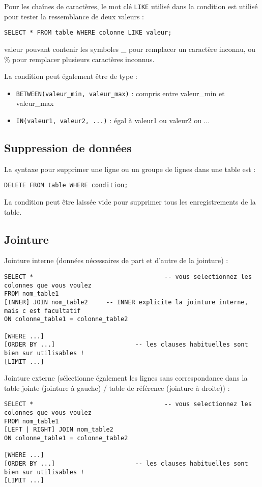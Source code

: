 \documentclass[11pt]{article}
\begin{document}
				Pour les chaînes de caractères, le mot clé \lstinline{LIKE} utilisé dans la condition est utilisé pour tester la ressemblance de deux valeurs : 
				\begin{lstlisting}
SELECT * FROM table WHERE colonne LIKE valeur;				
				\end{lstlisting}
				valeur pouvant contenir les symboles \_ pour remplacer un caractère inconnu, ou \% pour remplacer plusieurs caractères inconnus.
				
				La condition peut également être de type :
				\begin{itemize}
					\item \lstinline{BETWEEN(valeur_min, valeur_max)} : compris entre valeur\_min et valeur\_max
					\item \lstinline{IN(valeur1, valeur2, ...)} : égal à valeur1 ou valeur2 ou ...
				\end{itemize}

			
			\subsection{Suppression de données}
				La syntaxe pour supprimer une ligne ou un groupe de lignes dans une table est :
				\begin{lstlisting}
DELETE FROM table WHERE condition;				
				\end{lstlisting}
				
				La condition peut être laissée vide pour supprimer tous les enregistrements de la table.
		
		
			\subsection{Jointure}
				Jointure interne (données nécessaires de part et d'autre de la jointure) :
				\begin{lstlisting}
SELECT *									-- vous selectionnez les colonnes que vous voulez
FROM nom_table1   
[INNER] JOIN nom_table2		-- INNER explicite la jointure interne, mais c est facultatif
ON colonne_table1 = colonne_table2

[WHERE ...]                               
[ORDER BY ...]						-- les clauses habituelles sont bien sur utilisables !
[LIMIT ...]
				\end{lstlisting}
				
				
				Jointure externe (sélectionne également les lignes sans correspondance dans la table jointe (jointure à gauche) / table de référence (jointure à droite)) :
				\begin{lstlisting}
SELECT *									-- vous selectionnez les colonnes que vous voulez
FROM nom_table1   
[LEFT | RIGHT] JOIN nom_table2
ON colonne_table1 = colonne_table2

[WHERE ...]                               
[ORDER BY ...]						-- les clauses habituelles sont bien sur utilisables !
[LIMIT ...]
				\end{lstlisting}
				
		
				
\end{document}
